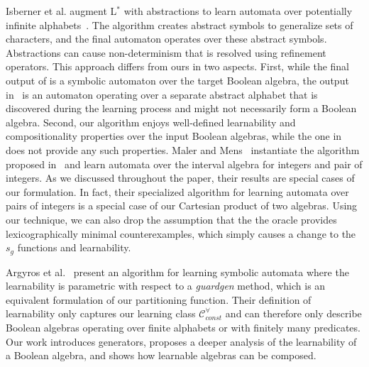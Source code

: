 Isberner et al. augment L$^*$ with abstractions to learn automata over 
potentially infinite alphabets~\cite{Isberner2013}.
The algorithm creates abstract symbols to generalize sets of characters,
and the final automaton operates over these abstract symbols. 
Abstractions can cause non-determinism that is resolved using refinement operators.
This approach differs from ours in two aspects. 
First, while the final output of \alg is a symbolic automaton over the target Boolean algebra,
the output in~\cite{Isberner2013} is an automaton operating over a separate abstract alphabet that
is discovered during the learning process and might not necessarily form a Boolean algebra.
Second, our algorithm enjoys well-defined learnability  and compositionality properties over the input Boolean algebras,
while the one in~\cite{Isberner2013} does not provide any such properties.
Maler and Mens~\cite{mens15} instantiate the algorithm proposed in~\cite{Isberner2013} and 
learn automata over the interval algebra
for integers and pair of integers.
As we discussed throughout the paper, 
their results are special cases of our formulation. 
In fact, their specialized algorithm %
for learning automata over pairs of integers
is a special case of our Cartesian product of two algebras.
Using our technique, we can also drop the assumption that the
the oracle provides lexicographically minimal counterexamples,
which simply causes a change  to the $s_g$ functions and learnability.

Argyros et al.~\cite{ArgyrosSKK16} present an algorithm
for learning symbolic automata where
the learnability is parametric with respect
to a \emph{guardgen} method, which
is an equivalent formulation of our partitioning
function.
Their definition of learnability only captures
our learning class $\mathcal{C}_\textit{const}^\forall$ and can therefore only 
describe Boolean algebras operating over finite alphabets or with finitely many predicates.
Our work introduces generators, proposes
a deeper analysis of the learnability of a Boolean algebra,
and shows how learnable algebras can be composed.


